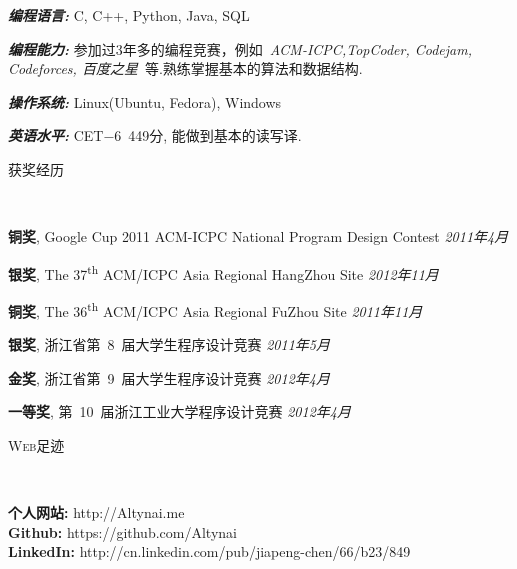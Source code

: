 ﻿\documentclass[9pt]{article}
\newenvironment{changemargin}[2]{%
  \begin{list}{}{%
    \setlength{\topsep}{0pt}%
    \setlength{\leftmargin}{#1}%
    \setlength{\rightmargin}{#2}%
    \setlength{\listparindent}{\parindent}%
    \setlength{\itemindent}{\parindent}%
    \setlength{\parsep}{\parskip}%
  }%
  \item[]}{\end{list}
}
\newcommand{\lineover}{
	\begin{changemargin}{-0.05in}{-0.05in}
		\vspace*{-8pt}
		\hrulefill \\
		\vspace*{-2pt}
	\end{changemargin}
}
\newcommand{\header}[1]{
	\begin{changemargin}{-0.5in}{-0.5in}
		\scshape{#1}\\
  	\lineover
	\end{changemargin}
}
\newenvironment{body} {
	\vspace*{-16pt}
	\begin{changemargin}{-0.25in}{-0.5in}
  }	
	{\end{changemargin}
}
\newcommand\nth{\textsuperscript{th}} %
\begin{document}
\begin{body}
	\vspace{14pt}
	\emph{\textbf{编程语言:}}{} C, C++, Python, Java, SQL \\
	\medskip

    \emph{\textbf{编程能力:}}{} 参加过3年多的编程竞赛，例如~\emph{ACM-ICPC,TopCoder, Codejam, Codeforces, 百度之星}~等.熟练掌握基本的算法和数据结构.\\
	\medskip

	\emph{\textbf{操作系统:}}{} Linux(Ubuntu, Fedora), Windows \\
    \medskip

    \emph{\textbf{英语水平:}}{} CET$-$6~449分, 能做到基本的读写译.\\
\end{body}

\smallskip

\header{获奖经历}

\begin{body}
	\vspace{14pt}

	\textbf{铜奖}, Google Cup 2011 ACM-ICPC National Program Design Contest \hfill{} \emph{2011年4月}\\
	\smallskip

	\textbf{银奖}, The 37\nth{} ACM/ICPC Asia Regional HangZhou Site \hfill{} \emph{2012年11月}\\
	\smallskip

	\textbf{铜奖}, The 36\nth{} ACM/ICPC Asia Regional FuZhou Site \hfill{} \emph{2011年11月}\\
	\smallskip

	\textbf{银奖}, 浙江省第~8~届大学生程序设计竞赛 \hfill{} \emph{2011年5月}\\
	\smallskip

	\textbf{金奖}, 浙江省第~9~届大学生程序设计竞赛 \hfill{} \emph{2012年4月}\\
	\smallskip

	\textbf{一等奖}, 第~10~届浙江工业大学程序设计竞赛 \hfill{} \emph{2012年4月}\\
\end{body}

\smallskip

\header{Web足迹}

\begin{body}
	\vspace{14pt}
    \textbf{个人网站:} http://Altynai.me \\
    \textbf{Github:} https://github.com/Altynai \\
    \textbf{LinkedIn:} http://cn.linkedin.com/pub/jiapeng-chen/66/b23/849\\
\end{body}
\end{document}
